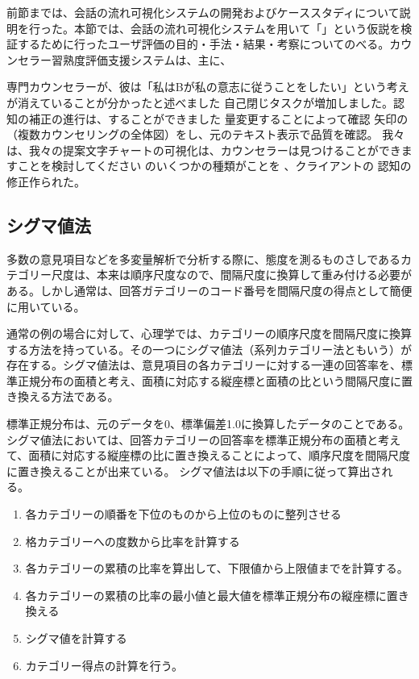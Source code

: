 \documentclass[shuuron]{kuee}
\begin{document}
前節までは、会話の流れ可視化システムの開発およびケーススタディについて説明を行った。本節では、会話の流れ可視化システムを用いて「」という仮説を検証するために行ったユーザ評価の目的・手法・結果・考察についてのべる。カウンセラー習熟度評価支援システムは、主に、


  専門カウンセラーが、彼は「私はBが私の意志に従うことをしたい」という考えが消えていることが分かったと述べました
自己閉じタスクが増加しました。認知の補正の進行は、することができました 量変更することによって確認 矢印の（複数カウンセリングの全体図）をし、元のテキスト表示で品質を確認。 我々は、我々の提案文字チャートの可視化は、カウンセラーは見つけることができますことを検討してください のいくつかの種類がことを 、クライアントの 認知の修正作られた。
\subsection{シグマ値法}
多数の意見項目などを多変量解析で分析する際に、態度を測るものさしであるカテゴリー尺度は、本来は順序尺度なので、間隔尺度に換算して重み付ける必要がある。しかし通常は、回答ガテゴリーのコード番号を間隔尺度の得点として簡便に用いている。

通常の例の場合に対して、心理学では、カテゴリーの順序尺度を間隔尺度に換算する方法を持っている。その一つにシグマ値法（系列カテゴリー法ともいう）が存在する。シグマ値法は、意見項目の各カテゴリーに対する一連の回答率を、標準正規分布の面積と考え、面積に対応する縦座標と面積の比という間隔尺度に置き換える方法である。

標準正規分布は、元のデータを0、標準偏差1.0に換算したデータのことである。シグマ値法においては、回答カテゴリーの回答率を標準正規分布の面積と考えて、面積に対応する縦座標の比に置き換えることによって、順序尺度を間隔尺度に置き換えることが出来ている。
シグマ値法は以下の手順に従って算出される。
\begin{enumerate}
 \item 各カテゴリーの順番を下位のものから上位のものに整列させる
 \item 格カテゴリーへの度数から比率を計算する
 \item 各カテゴリーの累積の比率を算出して、下限値から上限値までを計算する。
 \item 各カテゴリーの累積の比率の最小値と最大値を標準正規分布の縦座標に置き換える
 \item シグマ値を計算する
 \item カテゴリー得点の計算を行う。
\end{enumerate}
\end{document}
